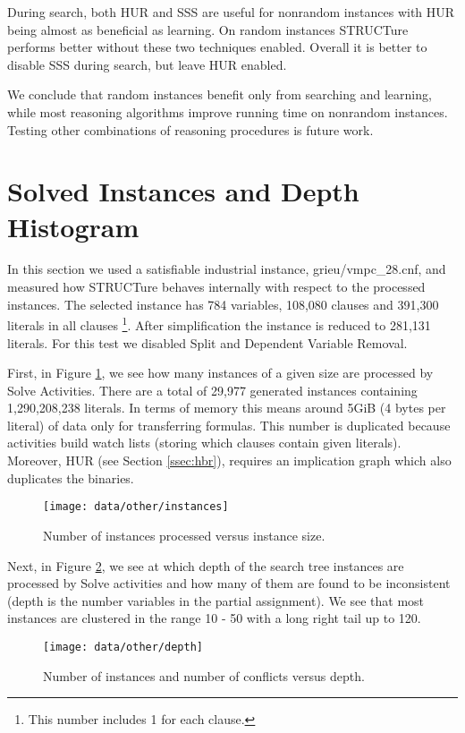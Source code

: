 During search, both HUR and SSS are useful for nonrandom instances
with HUR being almost as beneficial as learning. On random
instances STRUCTure performs better without these two techniques
enabled. Overall it is better to disable SSS during search, but
leave HUR enabled.

We conclude that random instances benefit only from searching and
learning, while most reasoning algorithms improve running time
on nonrandom instances.  Testing other combinations of reasoning
procedures is future work.

\section{Solved Instances and Depth Histogram}
\label{sec:histograms}

In this section we used a satisfiable industrial instance,
\textsf{grieu/vmpc\_28.cnf}, and measured how STRUCTure behaves
internally with respect to the processed instances. The selected
instance has 784 variables, 108,080 clauses and 391,300 literals in
all clauses \footnote{This number includes 1 for each clause.}. After
simplification the instance is reduced to 281,131 literals. For
this test we disabled Split and Dependent Variable Removal.

First, in Figure \ref{fig:num-instances}, we see how many instances
of a given size are processed by Solve Activities. There are a total
of 29,977 generated instances containing 1,290,208,238 literals. In
terms of memory this means around 5GiB (4 bytes per literal) of data
only for transferring formulas. This number is duplicated because
activities build watch lists (storing which clauses contain given
literals). Moreover, HUR (see Section \ref{ssec:hbr}), requires an
implication graph which also duplicates the binaries.

\begin{figure}
  \centering
  \texttt{[image: data/other/instances]}
  \caption{Number of instances processed versus instance size.}
  \label{fig:num-instances}
\end{figure}

Next, in Figure \ref{fig:num-depth}, we see at which depth of the
search tree instances are processed by Solve activities and how many
of them are found to be inconsistent (depth is the number variables
in the partial assignment). We see that most instances are
clustered in the range 10 - 50 with a long right tail up to 120.


\begin{figure}
  \centering
  \texttt{[image: data/other/depth]}
  \caption{Number of instances and number of conflicts versus depth.}
  \label{fig:num-depth}
\end{figure}


